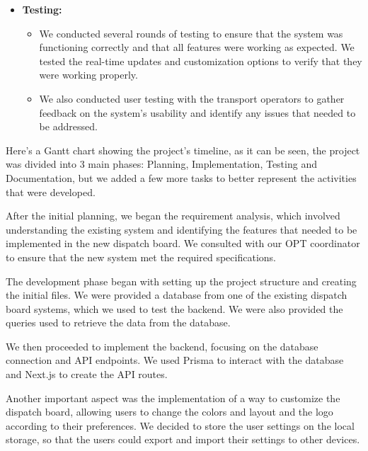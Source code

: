 \documentclass[10pt]{article}
\begin{document}
\begin{itemize}
\begin{itemize}
            \end{itemize}
            \item \textbf{Testing:}
            \begin{itemize}
                \item We conducted several rounds of testing to ensure that the system was functioning correctly and that all features were working as expected. We tested the real-time updates and customization options to verify that they were working properly.
                \item We also conducted user testing with the transport operators to gather feedback on the system's usability and identify any issues that needed to be addressed.
            \end{itemize}
        \end{itemize}

        Here's a Gantt chart showing the project's timeline, as it can be seen, the project was divided into 3 main phases: Planning, Implementation, Testing and Documentation, but we added a few more tasks to better represent the activities that were developed.
        
        After the initial planning, we began the requirement analysis, which involved understanding the existing system and identifying the features that needed to be implemented in the new dispatch board. We consulted with our OPT coordinator to ensure that the new system met the required specifications.
        
        The development phase began with setting up the project structure and creating the initial files. We were provided a database from one of the existing dispatch board systems, which we used to test the backend. We were also provided the queries used to retrieve the data from the database.
        
        We then proceeded to implement the backend, focusing on the database connection and API endpoints. We used Prisma to interact with the database and Next.js to create the API routes.
        
        Another important aspect was the implementation of a way to customize the dispatch board, allowing users to change the colors and layout and the logo according to their preferences. We decided to store the user settings on the local storage, so that the users could export and import their settings to other devices.
\end{document}
